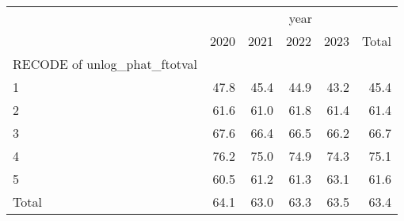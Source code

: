\begin{tabular}{llllll}
\cline{1-6}
\multicolumn{1}{c}{} &
  \multicolumn{5}{|c}{year} \\
\multicolumn{1}{c}{} &
  \multicolumn{1}{|r}{2020} &
  \multicolumn{1}{r}{2021} &
  \multicolumn{1}{r}{2022} &
  \multicolumn{1}{r}{2023} &
  \multicolumn{1}{r}{Total} \\
\cline{1-6}
\multicolumn{1}{l}{RECODE of unlog\_phat\_ftotval} &
  \multicolumn{1}{|r}{} &
  \multicolumn{1}{r}{} &
  \multicolumn{1}{r}{} &
  \multicolumn{1}{r}{} &
  \multicolumn{1}{r}{} \\
\multicolumn{1}{l}{\hspace{1em}1} &
  \multicolumn{1}{|r}{47.8} &
  \multicolumn{1}{r}{45.4} &
  \multicolumn{1}{r}{44.9} &
  \multicolumn{1}{r}{43.2} &
  \multicolumn{1}{r}{45.4} \\
\multicolumn{1}{l}{\hspace{1em}2} &
  \multicolumn{1}{|r}{61.6} &
  \multicolumn{1}{r}{61.0} &
  \multicolumn{1}{r}{61.8} &
  \multicolumn{1}{r}{61.4} &
  \multicolumn{1}{r}{61.4} \\
\multicolumn{1}{l}{\hspace{1em}3} &
  \multicolumn{1}{|r}{67.6} &
  \multicolumn{1}{r}{66.4} &
  \multicolumn{1}{r}{66.5} &
  \multicolumn{1}{r}{66.2} &
  \multicolumn{1}{r}{66.7} \\
\multicolumn{1}{l}{\hspace{1em}4} &
  \multicolumn{1}{|r}{76.2} &
  \multicolumn{1}{r}{75.0} &
  \multicolumn{1}{r}{74.9} &
  \multicolumn{1}{r}{74.3} &
  \multicolumn{1}{r}{75.1} \\
\multicolumn{1}{l}{\hspace{1em}5} &
  \multicolumn{1}{|r}{60.5} &
  \multicolumn{1}{r}{61.2} &
  \multicolumn{1}{r}{61.3} &
  \multicolumn{1}{r}{63.1} &
  \multicolumn{1}{r}{61.6} \\
\multicolumn{1}{l}{\hspace{1em}Total} &
  \multicolumn{1}{|r}{64.1} &
  \multicolumn{1}{r}{63.0} &
  \multicolumn{1}{r}{63.3} &
  \multicolumn{1}{r}{63.5} &
  \multicolumn{1}{r}{63.4} \\
\cline{1-6}
\end{tabular}
